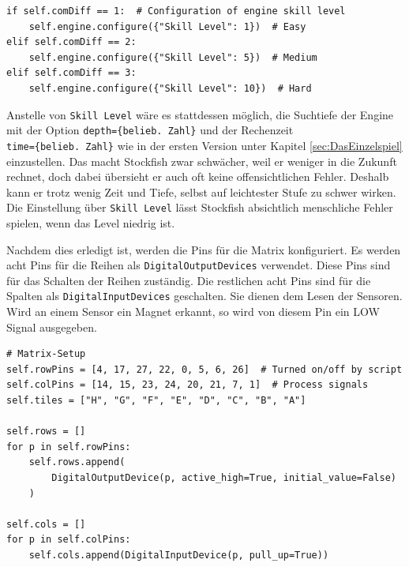 \begin{scriptsize}
\begin{lstlisting}[captionpos=b, caption = {Anfängliche Verarbeitung der Auswahl der Computerschwierigkeitsstufe}]
if self.comDiff == 1:  # Configuration of engine skill level
    self.engine.configure({"Skill Level": 1})  # Easy
elif self.comDiff == 2:
    self.engine.configure({"Skill Level": 5})  # Medium
elif self.comDiff == 3:
    self.engine.configure({"Skill Level": 10})  # Hard
\end{lstlisting}
\end{scriptsize}

Anstelle von \verb|Skill Level| wäre es stattdessen möglich, die Suchtiefe der Engine mit der Option 
\verb|depth={belieb. Zahl}| und der Rechenzeit\\ \verb|time={belieb. Zahl}| wie in der ersten Version unter 
Kapitel \ref{sec:DasEinzelspiel} einzustellen. Das macht Stockfish zwar schwächer, weil er weniger in die Zukunft 
rechnet, doch dabei übersieht er auch oft keine offensichtlichen Fehler. Deshalb kann er trotz wenig Zeit und Tiefe, 
selbst auf leichtester Stufe zu schwer wirken. Die Einstellung über \verb|Skill Level| lässt Stockfish absichtlich 
menschliche Fehler spielen, wenn das Level niedrig ist.

Nachdem dies erledigt ist, werden die Pins für die Matrix konfiguriert. Es werden acht Pins für die Reihen als 
\verb|DigitalOutputDevices| verwendet. Diese Pins sind für das Schalten der Reihen zuständig. Die restlichen acht 
Pins sind für die Spalten als \verb|DigitalInputDevices| geschalten. Sie dienen dem Lesen der Sensoren. Wird an einem 
Sensor ein Magnet erkannt, so wird von diesem Pin ein LOW Signal ausgegeben.\\

\begin{scriptsize}
\begin{lstlisting}[captionpos=b, caption = {Setzen von Schalte- und Lesepins für die Matrix}]
# Matrix-Setup
self.rowPins = [4, 17, 27, 22, 0, 5, 6, 26]  # Turned on/off by script
self.colPins = [14, 15, 23, 24, 20, 21, 7, 1]  # Process signals
self.tiles = ["H", "G", "F", "E", "D", "C", "B", "A"]

self.rows = []
for p in self.rowPins:
    self.rows.append(
        DigitalOutputDevice(p, active_high=True, initial_value=False)
    )

self.cols = []
for p in self.colPins:
    self.cols.append(DigitalInputDevice(p, pull_up=True))
\end{lstlisting}
\end{scriptsize}

